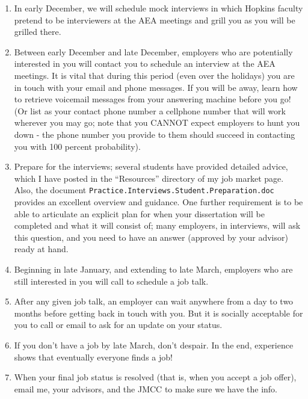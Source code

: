 \documentclass{econtex}
\begin{document}
\begin{enumerate}
\item In early December, we will schedule mock interviews in which
  Hopkins faculty pretend to be interviewers at the AEA meetings and
  grill you as you will be grilled there.
  
\item Between early December and late December, employers who are
  potentially interested in you will contact you to schedule an
  interview at the AEA meetings.  It is vital that during this period
  (even over the holidays) you are in touch with your email and phone
  messages.  If you will be away, learn how to retrieve voicemail
  messages from your answering machine before you go!  (Or list as
  your contact phone number a cellphone number that will work wherever
  you may go; note that you CANNOT expect employers to hunt you down -
  the phone number you provide to them should succeed in contacting
  you with 100 percent probability).
  
\item Prepare for the interviews; several students have provided
  detailed advice, which I have posted in the ``Resources'' directory
  of my job market page.  Also, the document
  \texttt{Practice.Interviews.Student.Preparation.doc} provides an
  excellent overview and guidance. One further requirement is to be
  able to articulate an explicit plan for when your dissertation will
  be completed and what it will consist of; many employers, in
  interviews, will ask this question, and you need to have an answer
  (approved by your advisor) ready at hand. \ifdvi\hypertarget{InterviewPrep}{}\fi
  
\item Beginning in late January, and extending to late March,
  employers who are still interested in you will call to schedule a
  job talk.
  
\item After any given job talk, an employer can wait anywhere from a
  day to two months before getting back in touch with you.  But it is
  socially acceptable for you to call or email to ask for an update on
  your status.
  
\item If you don't have a job by late March, don't despair.  In the
  end, experience shows that eventually everyone finds a job!

\item When your final job status is resolved (that is, when you accept 
a job offer), email me, your advisors, and the JMCC to make sure we have the info.

\end{enumerate}
  
\end{document}
